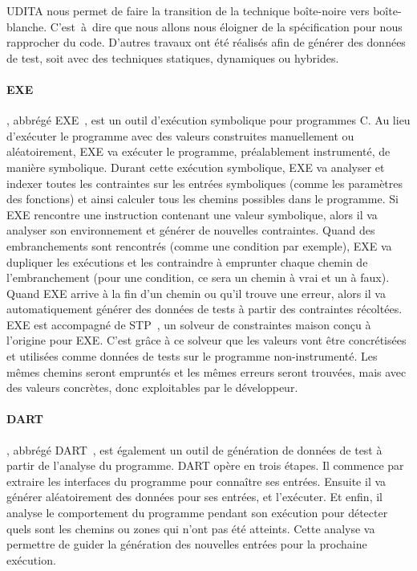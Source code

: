 UDITA nous permet de faire la transition de la technique boîte-noire vers
boîte-blanche. C'est~à~dire que nous allons nous éloigner de la spécification
pour nous rapprocher du code. D'autres travaux ont été réalisés afin de générer
des données de test, soit avec des techniques statiques, dynamiques ou hybrides.

\paragraph{EXE} , abbrégé
EXE~, est un outil d'exécution symbolique pour
programmes C.  Au lieu d'exécuter le programme avec des valeurs construites
manuellement ou aléatoirement, EXE va exécuter le programme, préalablement
instrumenté, de manière symbolique. Durant cette exécution symbolique, EXE va
analyser et indexer toutes les contraintes sur les entrées symboliques (comme
les paramètres des fonctions) et ainsi calculer tous les chemins possibles dans
le programme.  Si EXE rencontre une instruction contenant une valeur symbolique,
alors il va analyser son environnement et générer de nouvelles contraintes.
Quand des embranchements sont rencontrés (comme une condition par exemple), EXE
va dupliquer les exécutions et les contraindre à emprunter chaque chemin de
l'embranchement (pour une condition, ce sera un chemin à vrai et un à faux).
Quand EXE arrive à la fin d'un chemin ou qu'il trouve une erreur, alors il va
automatiquement générer des données de tests à partir des contraintes récoltées.
EXE est accompagné de STP~, un solveur de constraintes maison
conçu à l'origine pour EXE. C'est grâce à ce solveur que les valeurs vont être
concrétisées et utilisées comme données de tests sur le programme
non-instrumenté. Les mêmes chemins seront empruntés et les mêmes erreurs seront
trouvées, mais avec des valeurs concrètes, donc exploitables par le développeur.

\paragraph{DART} , abbrégé
DART~, est également un outil de génération de données de
test à partir de l'analyse du programme. DART opère en trois étapes. Il
commence par extraire les interfaces du programme pour connaître ses
entrées. Ensuite il va générer aléatoirement des données pour ses entrées, et
l'exécuter. Et enfin, il analyse le comportement du programme pendant son
exécution pour détecter quels sont les chemins ou zones qui n'ont pas été
atteints. Cette analyse va permettre de guider la génération des nouvelles
entrées pour la prochaine exécution.

